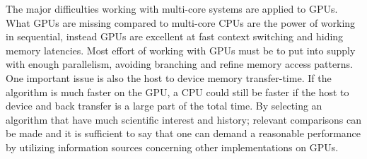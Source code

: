 The major difficulties working with multi-core systems are applied to GPUs. What GPUs are missing compared to multi-core CPUs are the power of working in sequential, instead GPUs are excellent at fast context switching and hiding memory latencies. Most effort of working with GPUs must be to put into supply with enough parallelism, avoiding branching and refine memory access patterns. One important issue is also the host to device memory transfer-time. If the algorithm is much faster on the GPU, a CPU could still be faster if the host to device and back transfer is a large part of the total time.
By selecting an algorithm that have much scientific interest and history; relevant comparisons can be made and it is sufficient to say that one can demand a reasonable performance by utilizing information sources concerning other implementations on GPUs. 

